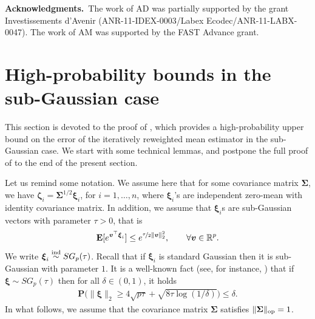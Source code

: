 \documentclass[aos,preprint,reqno]{imsart}
\newcommand\bxi{\boldsymbol\xi}
\newcommand\bzeta{\boldsymbol\zeta}
\newcommand\bSigma{\boldsymbol\Sigma}
\newcommand\bv{\boldsymbol v}
\theoremstyle{plain}
\theoremstyle{remark}
\begin{document}
    \textbf{Acknowledgments.}\ 
	The work of AD was partially supported by the grant
	Investissements d'Avenir (ANR-11-IDEX-0003/Labex Ecodec/ANR-11-LABX-0047). The work of AM was supported 
	by the FAST Advance grant. 




	{\renewcommand{\addtocontents}[2]{}
	}

    \newpage{}
    
    \appendix
    \section{High-probability bounds in the sub-Gaussian case}
    
    This section is devoted to the proof of , which 
    provides a high-probability upper bound on the error of the
    iteratively reweighted mean estimator in the sub-Gaussian 
    case. We start with some technical lemmas, and postpone the
    full proof of  to the end of the present section.
    
    Let us remind some notation. We assume here that for some 
    covariance matrix $\bSigma$, we have $\bzeta_i = \bSigma^{1/2}
    \bxi_i$, for $i=1,\ldots,n$, where $\bxi_i$'s are independent 
    zero-mean with identity covariance matrix. In addition, we 
    assume that $\bxi_i$s are sub-Gaussian vectors with parameter 
    $\tau>0$, that is
	\begin{align}
	    \mathbf E[e^{\bv^\top\bxi_i}] \le 
	    e^{\nicefrac{\tau}2 \|\bv\|_2^2},\qquad 
	    \forall \bv\in\mathbb R^p.
	\end{align}
	We write $\bxi_i\stackrel{\textup{ind}}{\sim} SG_p(\tau)$. Recall 
	that if $\bxi_i$ is standard Gaussian then it is sub-Gaussian with
	parameter $1$. It is a well-known fact (see, for instance, \citep[Theorem 1.19]{RigolletHutter}) 
	that if $\bxi\sim SG_p(\tau)$
	then for all $\delta\in(0,1)$, it holds
	\begin{align}\label{normSG}
	    \mathbf P\Big(\|\bxi\|_2\ge 4\sqrt{p\tau} + 
	    \sqrt{8\tau \log(1/\delta)}\Big)\le \delta. 
	\end{align}
	In what follows, we assume that the covariance matrix $\bSigma$
	satisfies $\|\bSigma\|_{\textup{op}}=1$. 
	
\end{document}
